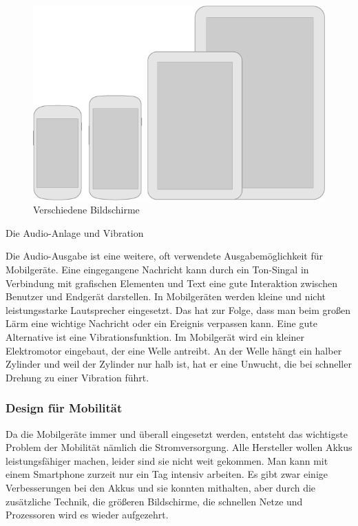  \begin{figure}[h]
 \centering
 \includegraphics[height=0.25\textheight]{img/devices_displays_main.png}
 \caption{Verschiedene Bildschirme}
\end{figure}

Die Audio-Anlage und Vibration

Die Audio-Ausgabe ist eine weitere, oft verwendete Ausgabemöglichkeit für Mobilgeräte. Eine eingegangene Nachricht kann durch ein Ton-Singal in Verbindung mit grafischen Elementen und Text eine gute Interaktion zwischen Benutzer und Endgerät darstellen. In Mobilgeräten werden kleine und nicht leistungsstarke Lautsprecher eingesetzt. Das hat zur Folge, dass man beim großen Lärm eine wichtige Nachricht oder ein Ereignis verpassen kann. Eine gute Alternative ist eine Vibrationsfunktion. Im Mobilgerät wird ein kleiner Elektromotor eingebaut, der eine Welle antreibt. An der Welle hängt ein halber Zylinder und weil der Zylinder nur halb ist, hat er eine Unwucht, die bei schneller Drehung zu einer Vibration führt.



\subsubsection{Design für Mobilität} %
\label{ssub:weiterf_hrung}

Da die Mobilgeräte immer und überall eingesetzt werden, entsteht das wichtigste Problem der Mobilität nämlich die Stromversorgung. Alle Hersteller wollen Akkus leistungsfähiger machen, leider sind sie nicht weit gekommen. Man kann mit einem Smartphone zurzeit nur ein Tag intensiv arbeiten. Es gibt zwar einige Verbesserungen bei den Akkus und sie konnten mithalten, aber durch die zusätzliche Technik, die größeren Bildschirme, die schnellen Netze und Prozessoren wird es wieder aufgezehrt.\cite{ndrarticle}

